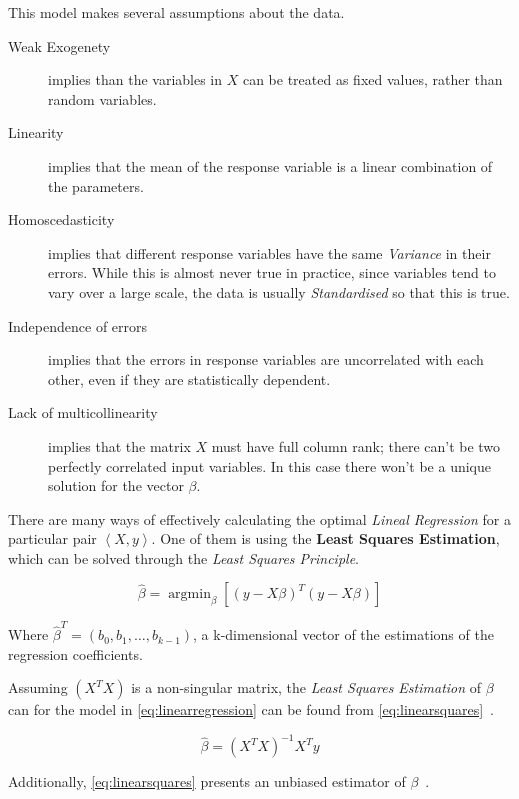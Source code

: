 This model makes several assumptions about the data.

\begin{description}
	\item[Weak Exogenety] implies than the variables in $X$ can be treated as fixed values, rather than random variables.
	\item[Linearity] implies that the mean of the response variable is a linear combination of the parameters.
	\item[Homoscedasticity] implies that different response variables have the same \emph{Variance} in their errors. While this is almost never true in practice, since variables tend to vary over a large scale, the data is usually \emph{Standardised} so that this is true.
	\item[Independence of errors] implies that the errors in response variables are uncorrelated with each other, even if they are statistically dependent.
	\item[Lack of multicollinearity] implies that the matrix $X$ must have full column rank; there can't be two perfectly correlated input variables. In this case there won't be a unique solution for the vector $\beta$.
\end{description}

There are many ways of effectively calculating the optimal \emph{Lineal Regression} for a particular pair $\left< X, y \right>$. One of them is using the \textbf{Least Squares Estimation}, which can be solved through the \emph{Least Squares Principle}.

\begin{equation}
\label{eq:leastsquaresprinciple}
	\hat{\beta} = \operatorname{argmin}_\beta \left[ {\left( y - X \beta \right)}^T \left( y - X \beta \right)\right]
\end{equation}

Where $\hat{\beta}^T = \left( b_0, b_1, \dots, b_{k - 1} \right)$, a k-dimensional vector of the estimations of the regression coefficients.

Assuming $\left( X^T X \right)$ is a non-singular matrix, the \emph{Least Squares Estimation} of $\beta$ can for the model in \cref{eq:linearregression} can be found from \cref{eq:linearsquares}~\cite{yan2009linear}.

\begin{equation}
\label{eq:linearsquares}
	\hat{\beta} = {\left( X^T X \right)}^{-1} X^T y
\end{equation}

Additionally, \cref{eq:linearsquares} presents an unbiased estimator of $\beta$~\cite{yan2009linear}.

